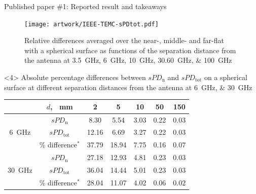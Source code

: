 \documentclass[xcolor=dvipsnames,10pt]{beamer}
\begin{document}
\begin{frame}{Published paper \#1: Reported result and takeaways}
\begin{onlyenv}
        \begin{figure}
            \centering
            \texttt{[image: artwork/IEEE-TEMC-sPDtot.pdf]}
            \caption{Relative differences averaged over the near-, middle- and far-flat with a spherical surface as functions of the separation distance from the antenna at \SIlist{3.5;6;10;30,60;100}{\GHz}}
        \end{figure}
    \end{onlyenv}
    \begin{onlyenv}<4>
        Absolute percentage differences between $sPD_\text{n}$ and $sPD_\text{tot}$ on a spherical surface at different separation distances from the antenna at \SIlist{6;30}{\GHz}
        \begin{table}[]
            \centering
            \begin{tabular}{c|c|c|c|c|c|c|}
            \cline{2-7}
             & $d$, \SI{}{\mm} & \num{2} & \num{5} & \num{10} & \num{50} & \num{150} \\ \hline
            \multicolumn{1}{|c|}{\multirow{3}{*}{\SI{6}{\GHz}}} & $sPD_\text{n}$ & 8.30 & 5.54 & 3.03 & 0.22 & 0.03 \\ \cline{2-7} 
            \multicolumn{1}{|c|}{} & $sPD_\text{tot}$ & 12.16 & 6.69 & 3.27 & 0.22 & 0.03 \\ \cline{2-7} 
            \multicolumn{1}{|c|}{} & \% difference${}^*$ & 37.79 & 18.94 & 7.75 & 0.16 & 0.07 \\ \hline
            \multicolumn{1}{|c|}{\multirow{3}{*}{\SI{30}{\GHz}}} & $sPD_\text{n}$ & 27.18 & 12.93 & 4.81 & 0.23 & 0.03 \\ \cline{2-7} 
            \multicolumn{1}{|c|}{} & $sPD_\text{tot}$ & 36.04 & 14.44 & 5.01 & 0.23 & 0.03 \\ \cline{2-7} 
            \multicolumn{1}{|c|}{} & \% difference${}^*$ & 28.04 & 11.07 & 4.02 & 0.06 & 0.02 \\ \hline
            \end{tabular}
        \end{table}
    \end{onlyenv}
\end{frame}
\end{document}

